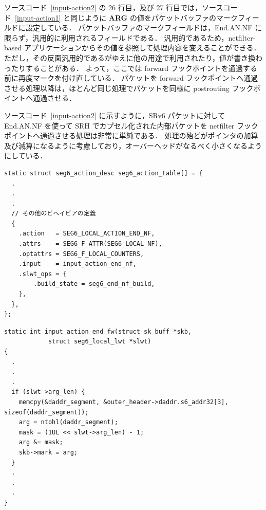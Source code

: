ソースコード~\ref*{input-action2} の 26 行目，及び 27 行目では，ソースコード~\ref*{input-action1} と同じように \textbf{ARG} の値をパケットバッファのマークフィールドに設定している．
パケットバッファのマークフィールドは，End.AN.NF に限らず，汎用的に利用されるフィールドである．
汎用的であるため，netfilter-based アプリケーションからその値を参照して処理内容を変えることができる．
ただし，その反面汎用的であるがゆえに他の用途で利用されたり，値が書き換わったりすることがある．
よって，ここでは forward フックポイントを通過する前に再度マークを付け直している．
パケットを forward フックポイントへ通過させる処理以降は，ほとんど同じ処理でパケットを同様に postrouting フックポイントへ通過させる．

ソースコード~\ref*{input-action2} に示すように，SRv6 パケットに対して End.AN.NF を使って SRH でカプセル化された内部パケットを netfilter フックポイントへ通過させる処理は非常に単純である．
処理の殆どがポインタの加算及び減算になるように考慮しており，オーバーヘッドがなるべく小さくなるようにしている．

\newpage

\begin{lstlisting}[caption=Add definition of End.AN.NF to seg6\_action\_table,label=seg6-action-desc]
static struct seg6_action_desc seg6_action_table[] = {
  .
  .
  .
  // その他のビヘイビアの定義
  {
    .action   = SEG6_LOCAL_ACTION_END_NF,
    .attrs    = SEG6_F_ATTR(SEG6_LOCAL_NF),
    .optattrs = SEG6_F_LOCAL_COUNTERS,
    .input    = input_action_end_nf,
    .slwt_ops = {
        .build_state = seg6_end_nf_build,
    },
  },
};
\end{lstlisting}

\begin{lstlisting}[caption=Set a mark to a packet buffer,label=input-action1]
static int input_action_end_fw(struct sk_buff *skb,
  			struct seg6_local_lwt *slwt)
{
  .
  .
  .
  if (slwt->arg_len) {
    memcpy(&daddr_segment, &outer_header->daddr.s6_addr32[3], sizeof(daddr_segment));
    arg = ntohl(daddr_segment);
    mask = (1UL << slwt->arg_len) - 1;
    arg &= mask;
    skb->mark = arg;
  }
  .
  .
  .
}
\end{lstlisting}

